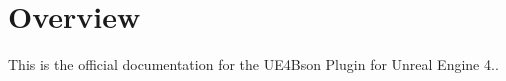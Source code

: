 \hypertarget{index_Overview}{}\section{Overview}\label{index_Overview}
This is the official documentation for the U\+E4\+Bson Plugin for Unreal Engine 4.. 